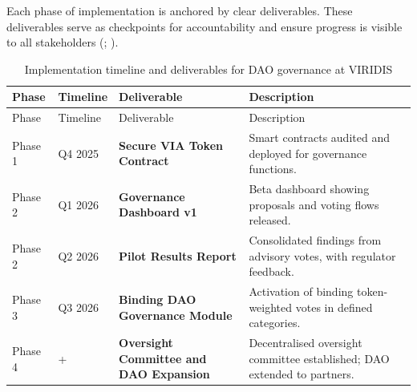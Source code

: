 \documentclass[
  english,
  12pt,
  oneside,
  open=any]{scrbook}
\begin{document}
Each phase of implementation is anchored by clear deliverables. These
deliverables serve as checkpoints for accountability and ensure progress
is visible to all stakeholders
(;
).

\begin{longtable}[]{@{}
  >{\raggedright\arraybackslash}p{}
  >{\raggedright\arraybackslash}p{}
  >{\raggedright\arraybackslash}p{}
  >{\raggedright\arraybackslash}p{}@{}}
\caption{Implementation timeline and deliverables for DAO governance at
VIRIDIS}\label{tbl-timeline}\tabularnewline
\toprule\noalign{}
\begin{minipage}[b]{\linewidth}\raggedright
Phase
\end{minipage} & \begin{minipage}[b]{\linewidth}\raggedright
Timeline
\end{minipage} & \begin{minipage}[b]{\linewidth}\raggedright
Deliverable
\end{minipage} & \begin{minipage}[b]{\linewidth}\raggedright
Description
\end{minipage} \\
\midrule\noalign{}
\endfirsthead
\toprule\noalign{}
\begin{minipage}[b]{\linewidth}\raggedright
Phase
\end{minipage} & \begin{minipage}[b]{\linewidth}\raggedright
Timeline
\end{minipage} & \begin{minipage}[b]{\linewidth}\raggedright
Deliverable
\end{minipage} & \begin{minipage}[b]{\linewidth}\raggedright
Description
\end{minipage} \\
\midrule\noalign{}
\endhead
\bottomrule\noalign{}
\endlastfoot
Phase 1 & Q4 2025 & \textbf{Secure VIA Token Contract} & Smart contracts
audited and deployed for governance functions. \\
Phase 2 & Q1 2026 & \textbf{Governance Dashboard v1} & Beta dashboard
showing proposals and voting flows released. \\
Phase 2 & Q2 2026 & \textbf{Pilot Results Report} & Consolidated
findings from advisory votes, with regulator feedback. \\
Phase 3 & Q3 2026 & \textbf{Binding DAO Governance Module} & Activation
of binding token-weighted votes in defined categories. \\
Phase 4 & 2027+ & \textbf{Oversight Committee and DAO Expansion} &
Decentralised oversight committee established; DAO extended to
partners. \\
\end{longtable}
\end{document}
